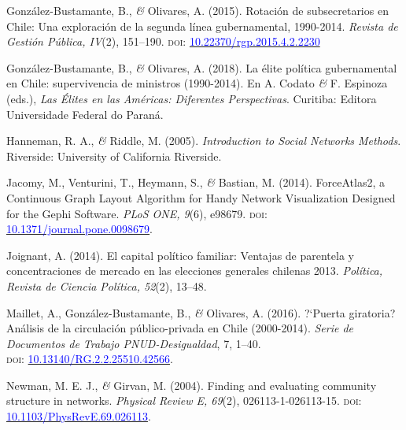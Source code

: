 \documentclass[a4paper]{tufte-handout}
\begin{document}
{\begin{list}{}
\item{\small González-Bustamante, B., {\itshape \&} Olivares, A. (2015). Rotación de subsecretarios en Chile: Una exploración de la segunda línea gubernamental, 1990-2014. {\itshape Revista de Gestión Pública, IV}(2), 151--190. {\scshape doi:} \href{https://doi.org/10.22370/rgp.2015.4.2.2230}{\textcolor{blue}{10.22370/rgp.2015.4.2.2230}}}

\item{\small Gonz\'alez-Bustamante, B., {\itshape \&} Olivares, A. (2018). La \'elite pol\'itica gubernamental en Chile: supervivencia de ministros (1990-2014). En A. Codato {\itshape \&} F. Espinoza (eds.),{ \itshape Las \'Elites en las Am\'ericas: Diferentes Perspectivas}. Curitiba: Editora Universidade Federal do Paran\'a.}

\item{\small Hanneman, R. A., {\itshape \&} Riddle, M. (2005). {\itshape Introduction to Social Networks Methods}. Riverside: University of California Riverside.}

\item{\small Jacomy, M., Venturini, T., Heymann, S., {\itshape \&} Bastian, M. (2014). ForceAtlas2, a Continuous Graph Layout Algorithm for Handy Network Visualization Designed for the Gephi Software. {\itshape PLoS ONE, 9}(6), e98679. {\scshape doi:} \href{https://doi.org/10.1371/journal.pone.0098679}{\textcolor{blue}{10.1371/journal.pone.0098679}}.}

\item{\small Joignant, A. (2014). El capital pol\'itico familiar: Ventajas de parentela y concentraciones de mercado en las elecciones generales chilenas 2013. {\itshape Pol\'itica, Revista de Ciencia Pol\'itica, 52}(2), 13--48.}

\item{\small Maillet, A., Gonz\'alez-Bustamante, B., {\itshape \&} Olivares, A. (2016). ?`Puerta giratoria? An\'alisis de la circulaci\'on p\'ublico-privada en Chile (2000-2014). {\itshape Serie de Documentos de Trabajo PNUD-Desigualdad}, 7,  1--40. \\ {\scshape doi:} \href{https://doi.org/10.13140/RG.2.2.25510.42566}{\textcolor{blue}{10.13140/RG.2.2.25510.42566}}.}

\item {\small Newman, M. E. J., {\itshape \&} Girvan, M. (2004). Finding and evaluating community structure in networks. {\itshape Physical Review E, 69}(2), 026113-1-026113-15. {\scshape doi:} \href{https://doi.org/10.1103/PhysRevE.69.026113}{\textcolor{blue}{10.1103/PhysRevE.69.026113}}.}


\end{list}}
\end{document}
